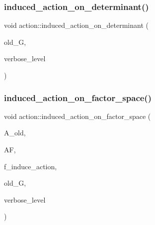 \mbox{\label{classaction_aa6b9d3c2ded2cae185ee31f2200ad0b5}} 
\subsubsection{\texorpdfstring{induced\+\_\+action\+\_\+on\+\_\+determinant()}{induced\_action\_on\_determinant()}}
{\footnotesize\ttfamily void action\+::induced\+\_\+action\+\_\+on\+\_\+determinant (\begin{DoxyParamCaption}\item[{\mbox{\hyperlink{classsims}{sims}} $\ast$}]{old\+\_\+G,  }\item[{\mbox{\hyperlink{galois_8h_a09fddde158a3a20bd2dcadb609de11dc}{I\+NT}}}]{verbose\+\_\+level }\end{DoxyParamCaption})}

\mbox{\label{classaction_af501ff2aa74fb6049bee5c01cd8b909b}} 
\subsubsection{\texorpdfstring{induced\+\_\+action\+\_\+on\+\_\+factor\+\_\+space()}{induced\_action\_on\_factor\_space()}}
{\footnotesize\ttfamily void action\+::induced\+\_\+action\+\_\+on\+\_\+factor\+\_\+space (\begin{DoxyParamCaption}\item[{\mbox{\hyperlink{classaction}{action}} $\ast$}]{A\+\_\+old,  }\item[{\mbox{\hyperlink{classaction__on__factor__space}{action\+\_\+on\+\_\+factor\+\_\+space}} $\ast$}]{AF,  }\item[{\mbox{\hyperlink{galois_8h_a09fddde158a3a20bd2dcadb609de11dc}{I\+NT}}}]{f\+\_\+induce\+\_\+action,  }\item[{\mbox{\hyperlink{classsims}{sims}} $\ast$}]{old\+\_\+G,  }\item[{\mbox{\hyperlink{galois_8h_a09fddde158a3a20bd2dcadb609de11dc}{I\+NT}}}]{verbose\+\_\+level }\end{DoxyParamCaption})}

